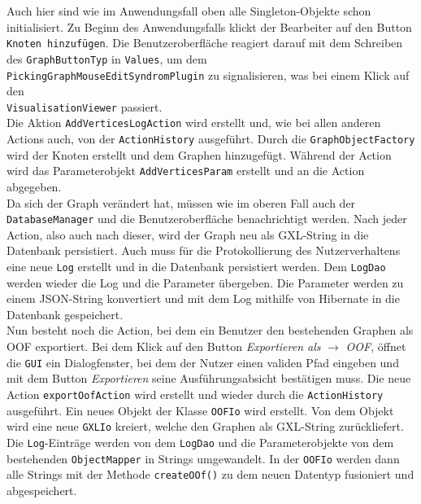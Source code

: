 \documentclass[enabledeprecatedfontcommands,fontsize=11pt,paper=a4,twoside]{scrartcl}
\begin{document}
	Auch hier sind wie im Anwendungsfall oben alle Singleton-Objekte schon initialisiert. Zu Beginn des Anwendungsfalls klickt der Bearbeiter auf den Button \texttt{Knoten hinzufügen}. Die Benutzeroberfläche reagiert darauf mit dem Schreiben des \texttt{GraphButtonTyp} in \texttt{Values}, um dem \\\texttt{PickingGraphMouseEditSyndromPlugin} zu signalisieren, was bei einem Klick auf den \\\texttt{VisualisationViewer} passiert.\\
	Die Aktion \texttt{AddVerticesLogAction} wird erstellt und, wie bei allen anderen Actions auch, von der \texttt{ActionHistory} ausgeführt. Durch die \texttt{GraphObjectFactory} wird der Knoten erstellt und dem Graphen hinzugefügt. Während der Action wird das Parameterobjekt \texttt{AddVerticesParam} erstellt und an die Action abgegeben.\\  
	Da sich der Graph verändert hat, müssen wie im oberen Fall auch der \texttt{DatabaseManager} und die Benutzeroberfläche benachrichtigt werden. Nach jeder Action, also auch nach dieser, wird der Graph neu als GXL-String in die Datenbank persistiert. Auch muss für die Protokollierung des Nutzerverhaltens eine neue \texttt{Log} erstellt und in die Datenbank persistiert werden. Dem \texttt{LogDao} werden wieder die Log und die Parameter übergeben. Die Parameter werden zu einem JSON-String konvertiert und mit dem Log mithilfe von Hibernate in die Datenbank gespeichert.\\
	Nun besteht noch die Action, bei dem ein Benutzer den bestehenden Graphen als OOF exportiert. Bei dem Klick auf den Button \textit{Exportieren als} $\rightarrow$ \textit{OOF}, öffnet die \texttt{GUI} ein Dialogfenster, bei dem der Nutzer einen validen Pfad eingeben und mit dem Button \textit{Exportieren} seine Ausführungsabsicht bestätigen muss. Die neue Action \texttt{exportOofAction} wird erstellt und wieder durch die \texttt{ActionHistory} ausgeführt. Ein neues Objekt der Klasse \texttt{OOFIo} wird erstellt. Von dem Objekt wird eine neue \texttt{GXLIo} kreiert, welche den Graphen als GXL-String zurückliefert. Die \texttt{Log}-Einträge werden von dem \texttt{LogDao} und die Parameterobjekte von dem bestehenden \texttt{ObjectMapper} in Strings umgewandelt. In der \texttt{OOFIo} werden dann alle Strings mit der Methode \texttt{createOOf()} zu dem neuen Datentyp fusioniert und abgespeichert.  
	
	
	
	
\end{document}
